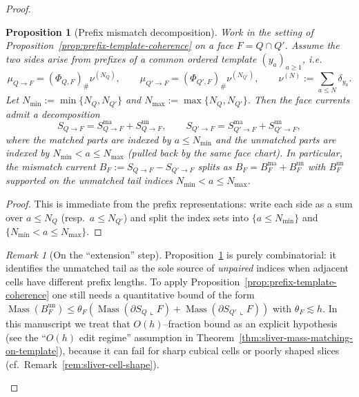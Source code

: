 \documentclass[11pt]{article}
\numberwithin{equation}{section}  %
\theoremstyle{plain}
\newtheorem{proposition}[theorem]{Proposition}
\theoremstyle{definition}
\theoremstyle{remark}
\newtheorem{remark}[theorem]{Remark}
\DeclareMathOperator{\Mass}{Mass}
\begin{document}
\begin{proof}
\begin{proposition}[Prefix mismatch decomposition]\label{prop:sliver-template-extension}
Work in the setting of Proposition~\ref{prop:prefix-template-coherence} on a face $F=Q\cap Q'$.
Assume the two sides arise from prefixes of a common ordered template $(y_a)_{a\ge 1}$, i.e.
\[
\mu_{Q\to F}=(\Phi_{Q,F})_\#\nu^{(N_Q)},\qquad
\mu_{Q'\to F}=(\Phi_{Q',F})_\#\nu^{(N_{Q'})},
\qquad \nu^{(N)}:=\sum_{a\le N}\delta_{y_a}.
\]
Let $N_{\min}:=\min\{N_Q,N_{Q'}\}$ and $N_{\max}:=\max\{N_Q,N_{Q'}\}$.
Then the face currents admit a decomposition
\[
S_{Q\to F}=S_{Q\to F}^{\mathrm{ma}}+S_{Q\to F}^{\mathrm{un}},\qquad
S_{Q'\to F}=S_{Q'\to F}^{\mathrm{ma}}+S_{Q'\to F}^{\mathrm{un}},
\]
where the matched parts are indexed by $a\le N_{\min}$ and the unmatched parts are indexed by
$N_{\min}<a\le N_{\max}$ (pulled back by the same face chart).
In particular, the mismatch current $B_F:=S_{Q\to F}-S_{Q'\to F}$ splits as
$B_F=B_F^{\mathrm{ma}}+B_F^{\mathrm{un}}$ with $B_F^{\mathrm{un}}$ supported on the unmatched tail indices
$N_{\min}<a\le N_{\max}$.
\end{proposition}

\begin{proof}
This is immediate from the prefix representations: write each side as a sum over $a\le N_Q$ (resp.\ $a\le N_{Q'}$)
and split the index sets into $\{a\le N_{\min}\}$ and $\{N_{\min}<a\le N_{\max}\}$.
\end{proof}


\begin{remark}[On the ``extension'' step]\label{rem:sliver-template-extension}
Proposition~\ref{prop:sliver-template-extension} is purely combinatorial: it identifies the unmatched tail as
the sole source of \emph{unpaired} indices when adjacent cells have different prefix lengths.
To apply Proposition~\ref{prop:prefix-template-coherence} one still needs a quantitative bound of the form
$\Mass(B_F^{\mathrm{un}})\le \theta_F(\Mass(\partial S_Q\llcorner F)+\Mass(\partial S_{Q'}\llcorner F))$ with $\theta_F\lesssim h$.
In this manuscript we treat that $O(h)$--fraction bound as an explicit hypothesis (see the ``$O(h)$ edit regime'' assumption
in Theorem~\ref{thm:sliver-mass-matching-on-template}), because it can fail for sharp cubical cells or poorly shaped slices
(cf.\ Remark~\ref{rem:sliver-cell-shape}).
\end{remark}




\end{proof}
\end{document}
